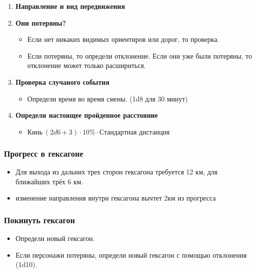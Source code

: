 \begin{enumerate}
  \item \textbf{Направление и вид передвижения}
  \item \textbf{Они потеряны?}
  \begin{itemize}
    \item Если нет никаких видимых ориентиров или дорог, то проверка.
    \item Если потеряны, то определи отклонение. Если они уже были потеряны, то отклонение может только расшириться.
  \end{itemize}
  \item \textbf{Проверка случаного события}
  \begin{itemize}
    \item Определи время во время смены. (1d8 для 30 минут)
  \end{itemize}
  \item \textbf{Определи настоящее пройденное расстояние}
  \begin{itemize}
    \item $\text{Кинь}\ ( 2d6 + 3 ) \cdot 10\% \cdot \text{Стандартная дистанция}$
  \end{itemize}
\end{enumerate}

\subsubsection*{Прогресс в гексагоне}
\begin{itemize}
  \item Для выхода из дальних трех сторон гексагона требуется 12 км, для ближайших трёх 6 км.
  \item изменение направления внутри гексагона вычтет 2км из прогресса 
\end{itemize}

\subsubsection*{Покинуть гексагон}
\begin{itemize}
  \item Определи новый гексагон.
  \item Если персонажи потеряны, определи новый гексагон с помощью отклонения (1d10).
\end{itemize}